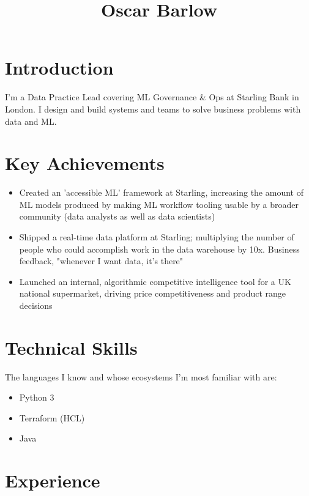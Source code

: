\documentclass[a4paper,10pt]{article}
\date{}
\begin{document}
\title{Oscar Barlow}
\maketitle

\section*{Introduction}
I'm a Data Practice Lead covering ML Governance \& Ops at
Starling Bank in London. I design and
build systems and teams to solve business problems with data and ML.

\section*{Key Achievements}
\begin{itemize}
    \item Created an 'accessible ML' framework at Starling, increasing the
          amount of ML models produced by making ML workflow tooling usable by
          a broader
          community (data analysts as well as data scientists)
    \item Shipped a real-time data platform at Starling; multiplying the number
          of people who could accomplish work in the data warehouse by 10x.
          Business
          feedback, "whenever I want data, it's there"
    \item Launched an internal, algorithmic competitive intelligence tool for a
          UK national supermarket, driving price competitiveness and product
          range
          decisions
\end{itemize}

\section*{Technical Skills}
The languages I know and whose ecosystems I'm most familiar with are:
\begin{itemize}
    \item Python 3
    \item Terraform (HCL)
    \item Java
\end{itemize}

\section*{Experience}
\end{document}
